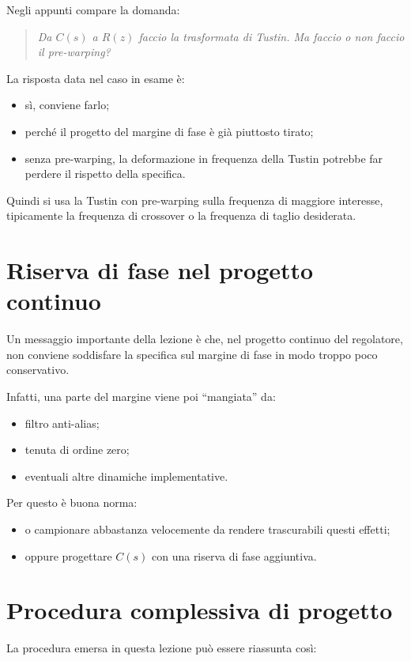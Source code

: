 Negli appunti compare la domanda:
\begin{quote}
\emph{Da \(C(s)\) a \(R(z)\) faccio la trasformata di Tustin. Ma faccio o non faccio il pre-warping?}
\end{quote}

La risposta data nel caso in esame \`e:
\begin{itemize}
    \item s\`i, conviene farlo;
    \item perch\'e il progetto del margine di fase \`e gi\`a piuttosto tirato;
    \item senza pre-warping, la deformazione in frequenza della Tustin potrebbe far perdere il rispetto della specifica.
\end{itemize}

Quindi si usa la Tustin con pre-warping sulla frequenza di maggiore interesse,
tipicamente la frequenza di crossover o la frequenza di taglio desiderata.

\section{Riserva di fase nel progetto continuo}

Un messaggio importante della lezione \`e che,
nel progetto continuo del regolatore,
non conviene soddisfare la specifica sul margine di fase in modo troppo poco conservativo.

Infatti, una parte del margine viene poi ``mangiata'' da:
\begin{itemize}
    \item filtro anti-alias;
    \item tenuta di ordine zero;
    \item eventuali altre dinamiche implementative.
\end{itemize}

Per questo \`e buona norma:
\begin{itemize}
    \item o campionare abbastanza velocemente da rendere trascurabili questi effetti;
    \item oppure progettare \(C(s)\) con una riserva di fase aggiuntiva.
\end{itemize}

\section{Procedura complessiva di progetto}

La procedura emersa in questa lezione pu\`o essere riassunta cos\`i:

